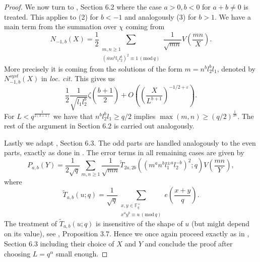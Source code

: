 \documentclass[12pt]{amsart}
\theoremstyle{plain}
\theoremstyle{definition}
\theoremstyle{remark}
\numberwithin{equation}{section}
\newcommand{\FF}{\mathbb{F}}
\newcommand{\mods}[1]{\,(\mathrm{mod}\,{#1})}
\renewcommand{\geq}{\geqslant}
\begin{document}
\begin{proof}
We now turn to \cite{FKMsecondmom}, Section 6.2 where the case $a>0, b<0$ for $a+b\neq 0$ is treated. 
This applies to (2) for $b<-1$ and analogously (3) for $b>1$. We have a main term from the summation over $\chi$ coming from 
$$N_{-1,b}(X)=\frac12\sum_{\substack{m,n\geq 1\\ (\bar m n^bl_1l_2^b)^2\equiv 1\mods q}}\frac{1}{\sqrt{mn}}V\left(\frac{mn}{X}\right).$$
More precisely it is coming from the solutions of the form $m=n^bl_2^bl_1$, denoted by $N^{syst}_{-1,b}(X)$ in \emph{loc. cit.} This gives us $$\frac 12 \frac{1}{\sqrt{l_1l_2^b}}\zeta\left(\frac{b+1}{2}\right)+O\left(\left(\frac{X}{L^{b+1}}\right)^{-1/2+\varepsilon}\right).$$ 
For $L<q^{\frac{1}{2(b+1)}}$ we have that $n^bl_2^bl_1\geq q/2$ implies $\max(m,n)\geq(q/2)^{\frac{1}{2b}}$. The rest of the argument in Section 6.2 is carried out analogously.








Lastly we adapt \cite{FKMsecondmom}, Section 6.3. The odd parts are handled analogously to the even parts, exactly as done in \cite{FKMsecondmom}.
The error terms in all remaining cases are given by 
$$   P_{a,b}(Y)=\frac{1}{2\sqrt q}\sum_{m,n\geq 1}\frac{1}{\sqrt{mn}}\widetilde{T}_{2a,2b}((m^an^bl_1^{\pm a}l_2^{-b})^2;q)V\left(\frac{mn}{Y}\right),$$
    where 
$$\widetilde{T}_{a,b}(u;q)=\frac{1}{\sqrt q}\sum_{\substack{x,y\in \FF_q^\times \\x^ay^b\equiv u \mods q}}e\left(\frac{x+y}{q}\right).$$ 
The treatment of $\widetilde{T}_{a,b}(u;q)$ is insensitive of the shape of $u$ (but might depend on its value), see \cite{FKMsecondmom}, 
Proposition 3.7. 
Hence we once again proceed exactly as in \cite{FKMsecondmom}, Section 6.3 including their choice of $X$ and $Y$ and conclude the proof after choosing $L=q^\alpha$ small enough.




\end{proof}
\end{document}
